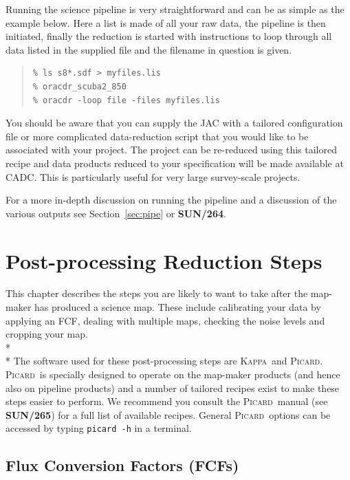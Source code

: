 \documentclass[twoside,11pt]{article}
\newcommand{\htmlref}[2]{#1}
\newcommand{\latexhtml}[2]{#1}
\newcommand{\xref}[3]{#1}
\newcommand{\xlabel}[1]{}
\renewcommand{\_}{\texttt{\symbol{95}}}
\newenvironment{myquote}{\begin{quote}\begin{small}}{\end{small}\end{quote}}
\newcommand{\Kappa}{\xref{\textsc{Kappa}}{sun95}{}}
\newcommand{\picard}{\xref{\textsc{Picard}}{sun265}{}}
\newcommand{\picardsun}{\xref{\textbf{SUN/265}}{sun265}{}}
\newcommand{\pipelinesun}{\xref{\textbf{SUN/264}}{sun264}{}}
\newcommand{\cref}[3]{\latexhtml{#1~\ref{#2}}{\htmlref{#3}{#2}}}
\begin{document}
Running the science pipeline is very straightforward and can be as
simple as the example below. Here a list is made of all your raw data,
the pipeline is then initiated, finally the reduction is started with
instructions to loop through all data listed in the supplied file and
the filename in question is given.

\begin{myquote}
\begin{verbatim}
% ls s8*.sdf > myfiles.lis
% oracdr_scuba2_850
% oracdr -loop file -files myfiles.lis
\end{verbatim}
\end{myquote}

You should be aware that you can supply the JAC with a tailored
configuration file or more complicated data-reduction script that you
would like to be associated with your project. The project can be
re-reduced using this tailored recipe and data products reduced to
your specification will be made available at CADC. This is
particularly useful for very large survey-scale projects.

For a more in-depth discussion on running the pipeline and a discussion
of the various outputs see \cref{Section}{sec:pipe}{The SCUBA-2
Pipeline} or \pipelinesun.
\clearpage

\section{\xlabel{maps}Post-processing Reduction Steps}
\label{sec:postprocess}

This chapter describes the steps you are likely to want to take after
the map-maker has produced a science map. These include calibrating
your data by applying an FCF, dealing with multiple maps, checking the
noise levels and cropping your map.
\\*\\*
The software used for these post-processing steps are \Kappa\ and
\picard. \picard\ is specially designed to operate on the map-maker
products (and hence also on pipeline products) and a number of tailored
recipes exist to make these steps easier to perform. We recommend you
consult the \picard\ manual (see \picardsun) for a full list of
available recipes. General \picard\ options can be accessed by typing
\texttt{picard -h} in a terminal.

\subsection{\xlabel{apply_fcf}Flux Conversion Factors (FCFs)}
\label{sec:cmult}
\end{document}

